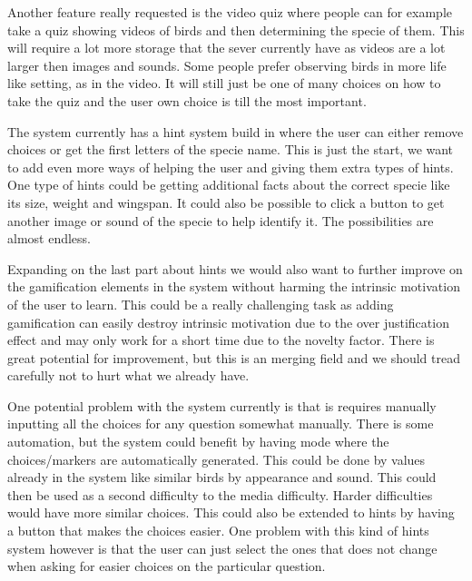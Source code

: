 Another feature really requested is the video quiz where people can for example take a quiz showing videos of birds and then determining the specie of them. This will require a lot more storage that the sever currently have as videos are a lot larger then images and sounds. Some people prefer observing birds in more life like setting, as in the video. It will still just be one of many choices on how to take the quiz and the user own choice is till the most important.

The system currently has a hint system build in where the user can either remove choices or get the first letters of the specie name. This is just the start, we want to add even more ways of helping the user and giving them extra types of hints. One type of hints could be getting additional facts about the correct specie like its size, weight and wingspan. It could also be possible to click a button to get another image or sound of the specie to help identify it. The possibilities are almost endless.

Expanding on the last part about hints we would also want to further improve on the gamification elements in the system without harming the intrinsic motivation of the user to learn. This could be a really challenging task as adding gamification can easily destroy intrinsic motivation due to the over justification effect and may only work for a short time due to the novelty factor\cite{DoesG74:online}. There is great potential for improvement, but this is an merging field and we should tread carefully not to hurt what we already have. 

One potential problem with the system currently is that is requires manually inputting all the choices for any question somewhat manually. There is some automation, but the system could benefit by having mode where the choices/markers are automatically generated. This could be done by values already in the system like similar birds by appearance and sound. This could then  be used as a second difficulty to the media difficulty. Harder difficulties would have more similar choices. This could also be extended to hints by having a button that makes the choices easier. One problem with this kind of hints system however is that the user can just select the ones that does not change when asking for easier choices on the particular question.

